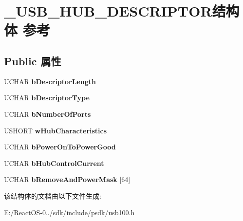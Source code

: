\hypertarget{struct___u_s_b___h_u_b___d_e_s_c_r_i_p_t_o_r}{}\section{\+\_\+\+U\+S\+B\+\_\+\+H\+U\+B\+\_\+\+D\+E\+S\+C\+R\+I\+P\+T\+O\+R结构体 参考}
\label{struct___u_s_b___h_u_b___d_e_s_c_r_i_p_t_o_r}
\subsection*{Public 属性}
\begin{DoxyCompactItemize}
\item 
\mbox{\label{struct___u_s_b___h_u_b___d_e_s_c_r_i_p_t_o_r_a856990a86e4a81d090390d65d0cadc96}} 
U\+C\+H\+AR {\bfseries b\+Descriptor\+Length}
\item 
\mbox{\label{struct___u_s_b___h_u_b___d_e_s_c_r_i_p_t_o_r_a7d3c55a441d126885d10f830bcbf8d05}} 
U\+C\+H\+AR {\bfseries b\+Descriptor\+Type}
\item 
\mbox{\label{struct___u_s_b___h_u_b___d_e_s_c_r_i_p_t_o_r_a66a2734ad3b02ce680c314b18a045342}} 
U\+C\+H\+AR {\bfseries b\+Number\+Of\+Ports}
\item 
\mbox{\label{struct___u_s_b___h_u_b___d_e_s_c_r_i_p_t_o_r_a5f0847f3efe925ef24b81accadd3b0c1}} 
U\+S\+H\+O\+RT {\bfseries w\+Hub\+Characteristics}
\item 
\mbox{\label{struct___u_s_b___h_u_b___d_e_s_c_r_i_p_t_o_r_ac8193e4c1053f73b926f2a0586fb6821}} 
U\+C\+H\+AR {\bfseries b\+Power\+On\+To\+Power\+Good}
\item 
\mbox{\label{struct___u_s_b___h_u_b___d_e_s_c_r_i_p_t_o_r_a71cf6954d0f4ede55b3fb33607f17a3f}} 
U\+C\+H\+AR {\bfseries b\+Hub\+Control\+Current}
\item 
\mbox{\label{struct___u_s_b___h_u_b___d_e_s_c_r_i_p_t_o_r_a764a02b7d4f278d3cc5532ed9e713064}} 
U\+C\+H\+AR {\bfseries b\+Remove\+And\+Power\+Mask} \mbox{[}64\mbox{]}
\end{DoxyCompactItemize}


该结构体的文档由以下文件生成\+:\begin{DoxyCompactItemize}
\item 
E\+:/\+React\+O\+S-\/0../sdk/include/psdk/usb100.\+h\end{DoxyCompactItemize}
